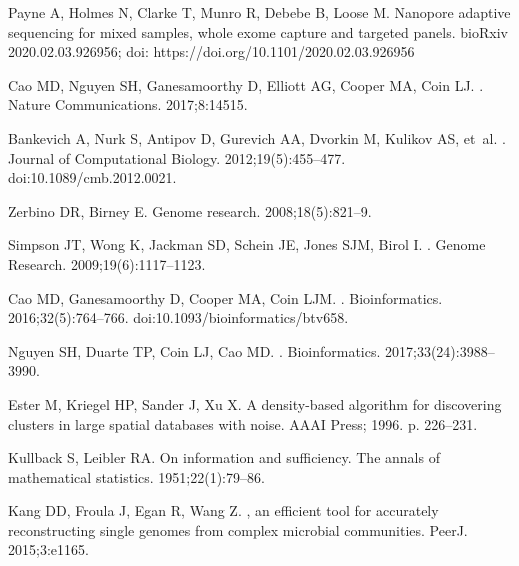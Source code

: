 \documentclass[10pt,letterpaper]{article}
\begin{document}
\begin{thebibliography}{10}

Payne A, Holmes N, Clarke T, Munro R, Debebe B, Loose M.
\newblock Nanopore adaptive sequencing for mixed samples, whole exome capture and targeted panels.
\newblock bioRxiv 2020.02.03.926956; 
\newblock doi: https://doi.org/10.1101/2020.02.03.926956

Cao MD, Nguyen SH, Ganesamoorthy D, Elliott AG, Cooper MA, Coin LJ.
.
\newblock Nature Communications. 2017;8:14515.

Bankevich A, Nurk S, Antipov D, Gurevich AA, Dvorkin M, Kulikov AS, et~al.
.
\newblock Journal of Computational Biology. 2012;19(5):455--477.
\newblock doi:{10.1089/cmb.2012.0021}.

Zerbino DR, Birney E.
\newblock Genome research. 2008;18(5):821--9.

Simpson JT, Wong K, Jackman SD, Schein JE, Jones SJM, Birol I.
.
\newblock Genome Research. 2009;19(6):1117--1123.

Cao MD, Ganesamoorthy D, Cooper MA, Coin LJM.
.
\newblock Bioinformatics. 2016;32(5):764--766.
\newblock doi:{10.1093/bioinformatics/btv658}.

Nguyen SH, Duarte TP, Coin LJ, Cao MD.
.
\newblock Bioinformatics. 2017;33(24):3988--3990.

Ester M, Kriegel HP, Sander J, Xu X.
\newblock A density-based algorithm for discovering clusters in large spatial
  databases with noise.
\newblock AAAI Press; 1996. p. 226--231.

Kullback S, Leibler RA.
\newblock On information and sufficiency.
\newblock The annals of mathematical statistics. 1951;22(1):79--86.

Kang DD, Froula J, Egan R, Wang Z.
, an efficient tool for accurately reconstructing single
  genomes from complex microbial communities.
\newblock PeerJ. 2015;3:e1165.


\end{thebibliography}
\end{document}
